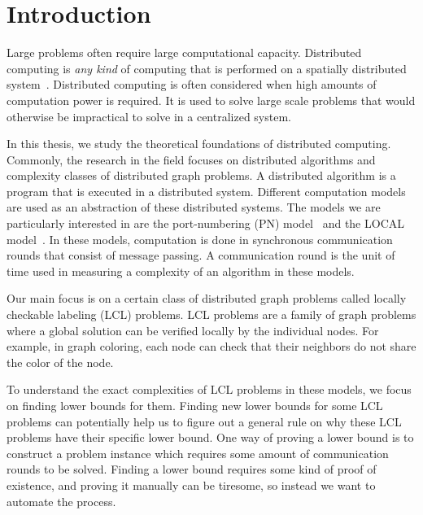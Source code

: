 
\section{Introduction}  \label{sec:introduction}

Large problems often require large computational capacity.
Distributed computing is \emph{any kind} of computing that is performed on a spatially distributed system~\cite{DBLP:books/el/leeuwen90/LamportL90}.
Distributed computing is often considered when high amounts of computation power is required.
It is used to solve large scale problems that would otherwise be impractical to solve in a centralized system.

In this thesis, we study the theoretical foundations of distributed computing.
Commonly, the research in the field focuses on distributed algorithms and complexity classes of distributed graph problems.
A distributed algorithm is a program that is executed in a distributed system.
Different computation models are used as an abstraction of these distributed systems.
The models we are particularly interested in are the port-numbering (PN) model~\cite{DBLP:conf/stoc/Angluin80} and the LOCAL model~\cite{DBLP:conf/focs/Linial87}.
In these models, computation is done in synchronous communication rounds that consist of message passing.
A communication round is the unit of time used in measuring a complexity of an algorithm in these models.

Our main focus is on a certain class of distributed graph problems called locally checkable labeling (LCL) problems.
LCL problems are a family of graph problems where a global solution can be verified locally by the individual nodes.
For example, in graph coloring, each node can check that their neighbors do not share the color of the node.


To understand the exact complexities of LCL problems in these models, we focus on finding lower bounds for them.
Finding new lower bounds for some LCL problems can potentially help us to figure out a general rule on why these LCL problems have their specific lower bound.
One way of proving a lower bound is to construct a problem instance which requires some amount of communication rounds to be solved.
Finding a lower bound requires some kind of proof of existence, and proving it manually can be tiresome, so instead we want to automate the process.

